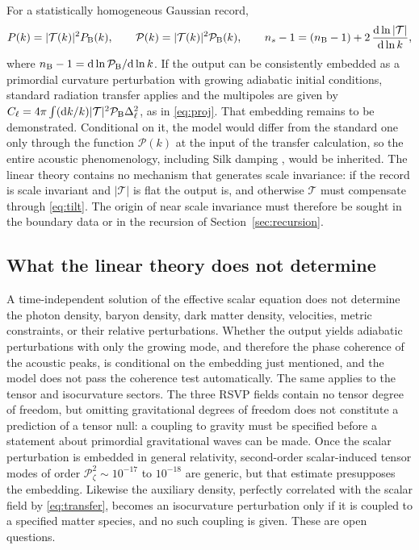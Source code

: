 \documentclass[11pt]{article}
\theoremstyle{definition}
\theoremstyle{remark}
\newcommand{\dd}{\mathrm{d}}
\newcommand{\TT}{\mathcal{T}}
\newcommand{\Pk}{\mathcal{P}}
\begin{document}
For a statistically homogeneous Gaussian record,
\begin{equation}
P(k)=|\TT(k)|^2P_{\rm B}(k),\qquad\Pk(k)=|\TT(k)|^2\Pk_{\rm B}(k),\qquad n_s-1=(n_{\rm B}-1)+2\,\frac{\dd\ln|\TT|}{\dd\ln k},
\label{eq:tilt}
\end{equation}
where $n_{\rm B}-1=\dd\ln\Pk_{\rm B}/\dd\ln k$. If the output can be consistently embedded as a primordial curvature perturbation with growing adiabatic initial conditions, standard radiation transfer applies and the multipoles are given by $C_\ell=4\pi\int(\dd k/k)|\TT|^2\Pk_{\rm B}\Delta_\ell^2$, as in \eqref{eq:proj}. That embedding remains to be demonstrated. Conditional on it, the model would differ from the standard one only through the function $\Pk(k)$ at the input of the transfer calculation, so the entire acoustic phenomenology, including Silk damping \cite{silk1968}, would be inherited. The linear theory contains no mechanism that generates scale invariance: if the record is scale invariant and $|\TT|$ is flat the output is, and otherwise $\TT$ must compensate through \eqref{eq:tilt}. The origin of near scale invariance must therefore be sought in the boundary data or in the recursion of Section~\ref{sec:recursion}.

\subsection{What the linear theory does not determine}\label{sec:notdetermined}

A time-independent solution of the effective scalar equation does not determine the photon density, baryon density, dark matter density, velocities, metric constraints, or their relative perturbations. Whether the output yields adiabatic perturbations with only the growing mode, and therefore the phase coherence of the acoustic peaks, is conditional on the embedding just mentioned, and the model does not pass the coherence test automatically. The same applies to the tensor and isocurvature sectors. The three RSVP fields contain no tensor degree of freedom, but omitting gravitational degrees of freedom does not constitute a prediction of a tensor null: a coupling to gravity must be specified before a statement about primordial gravitational waves can be made. Once the scalar perturbation is embedded in general relativity, second-order scalar-induced tensor modes of order $\Pk_\zeta^2\sim10^{-17}$ to $10^{-18}$ are generic, but that estimate presupposes the embedding. Likewise the auxiliary density, perfectly correlated with the scalar field by \eqref{eq:transfer}, becomes an isocurvature perturbation only if it is coupled to a specified matter species, and no such coupling is given. These are open questions.
\end{document}
